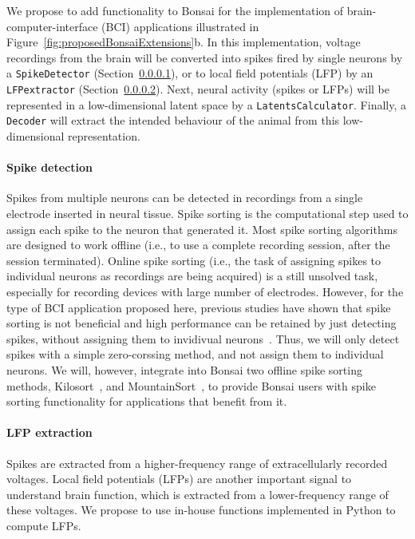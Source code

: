 We propose to add functionality to Bonsai for the implementation of
brain-computer-interface (BCI) applications illustrated in
Figure~\ref{fig:proposedBonsaiExtensions}b. In
this implementation, voltage recordings from the brain will be converted into
spikes fired by single neurons by a \texttt{SpikeDetector}
(Section~\ref{sec:spikeDetection}), or to local field potentials (LFP) by an
\texttt{LFPextractor} (Section~\ref{sec:lfpExtraction}). Next, neural activity
(spikes or LFPs) will be represented in a low-dimensional latent space by a
\texttt{LatentsCalculator}. Finally, a \texttt{Decoder} will extract the
intended behaviour of the animal from this low-dimensional representation.

\paragraph{Spike detection}
\label{sec:spikeDetection}

Spikes from multiple neurons can be detected in recordings from a single
electrode inserted in neural tissue. Spike sorting is the computational step
used to assign each spike to the neuron that generated it. Most spike sorting
algorithms are designed to work offline (i.e., to use a complete recording
session, after the session terminated). Online spike sorting (i.e., the task
of assigning spikes to individual neurons as recordings are being acquired) is a
still unsolved task, especially for recording devices with large number of
electrodes.
%
However, for the type of BCI application proposed here, previous studies have
shown that spike sorting is not beneficial and high performance can be retained
by just detecting spikes, without assigning them to invidivual
neurons~\citep{trautmannEtAl19,todorovaEtAl14}. Thus, we will only detect spikes with a simple zero-corssing method,
and not assign them to individual neurons.  We will, however, integrate into
Bonsai two offline spike sorting methods, Kilosort~\citep[][written in Matlab]{pachitariuEtAl16}, and MountainSort~\citep[][written in
Python]{chungEtAl17}, to provide Bonsai users with spike sorting functionality for
applications that benefit from it.

\paragraph{LFP extraction}
\label{sec:lfpExtraction}

Spikes are extracted from a higher-frequency range of extracellularly recorded
voltages. Local field potentials (LFPs) 
are another important signal to understand brain function, which is extracted
from a lower-frequency range of these voltages. We propose to use in-house
functions implemented in Python to compute LFPs.

